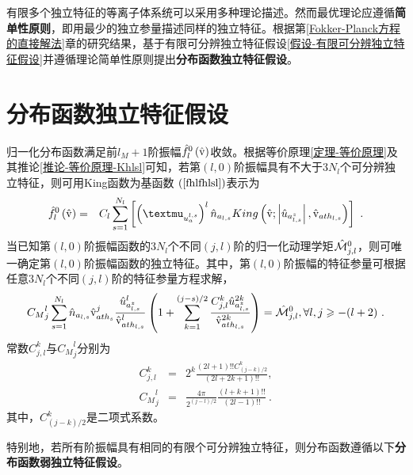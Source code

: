   有限多个独立特征的等离子体系统可以采用多种理论描述。然而最优理论应遵循\textbf{简单性原则}，即用最少的独立参量描述同样的独立特征。根据第\ref{Fokker-Planck方程的直接解法}章的研究结果，基于有限可分辨独立特征假设\ref{假设-有限可分辨独立特征假设}并遵循理论简单性原则提出\textbf{分布函数独立特征假设}。
  
\section{分布函数独立特征假设}
\label{分布函数独立特征假设}

  \begin{theorem} \label{假说-分布函数独立特征}
      归一化分布函数满足前$l_M+1$阶振幅$\hat{f}_l^0 \left(\hat{\mathrm{v}} \right)$收敛。根据等价原理\ref{定理-等价原理}及其推论\ref{推论-等价原理-Khlsl}可知，若第$(l,0)$阶振幅具有不大于$3N_l$个可分辨独立特征，则可用King函数为基函数$\EQ{fhlfhlsl}$表示为
      \begin{eqnarray}
          \fhl \left(\rmvh \right) &=& C_l \sum_{s=1}^{N_l} \left [ \left (\muuasl \right)^l \nhasl King \left(\rmvh;\left |\uhazsl \right |, \vhathsl \right) \right ] ~.  \label{fhlfhlslM}
      \end{eqnarray}
      当已知第$(l,0)$阶振幅函数的$3N_l$个不同$(j,l)$阶的归一化动理学矩${\hat{\mathcal{M}}}{_{j,l}^0}$，则可唯一确定第$(l,0)$阶振幅函数的独立特征。其中，第$(l,0)$阶振幅的特征参量可根据任意$3N_l$个不同$(j,l)$阶的特征参量方程求解，
      \begin{eqnarray}
            {C_M}_j^l \sum_{s=1}^{N_l} \hat{n}_{a_{l,s}} \hat{\mathrm{v}}_{{ath}_s}^j \frac{ {\hat{u}}_{a_{l,s}^z}^l}{\hat{\mathrm{v}}_{{ath}_{l,s}}^l} 
            \left (1 + \sum_{k=1}^{(j-s)/2} \frac{C_{j,l}^k  {\hat{u}}_{a_{l,s}^z}^{2k}}{\hat{\mathrm{v}}_{{ath}_{l,s}}^{2k}} \right) = {\hat{\mathcal{M}}}{_{j,l}^0} , \forall l, j \geqslant -(l+2) ~. \label{MhKjl0slM}
      \end{eqnarray}
      常数$C_{j,l}^k$与${C_M}_j^l$分别为
      \begin{eqnarray}
          C_{j,l}^k & = & 2^k \frac{(2 l + 1)!!  C_{(j-k)/2}^k}{(2 l + 2 k + 1)!!},
          \\
          {C_M}_j^l & = & \frac{ 4 \pi}{2^{(j-l)/2}}  \frac{(l + k + 1)!!}{(2 l - 1)!!} ~.
      \end{eqnarray}
      其中，$C_{(j-k)/2}^k$是二项式系数。
  \end{theorem}
特别地，若所有阶振幅具有相同的有限个可分辨独立特征，则分布函数遵循以下\textbf{分布函数弱独立特征假设}。

